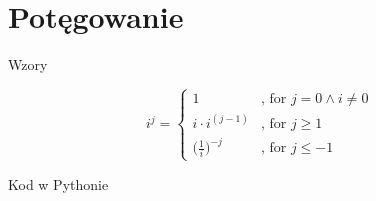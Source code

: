 \section{Potęgowanie}\label{sec:potęgowanie}
\begin{frame}{Wzory}
    \begin{definition}[recursion]
        \[ i^j =
        \begin{cases}
            1 & \text{, for } j = 0 \land i \neq 0 \\
            i \cdot i^{(j-1)} & \text{, for } j \geq 1 \\
            \Big( \frac{1}{i} \Big) ^{-j} & \text{, for } j \leq -1
        \end{cases}
        \]
    \end{definition}
\end{frame}
\begin{frame}{Kod w Pythonie}
    
    
\end{frame}
